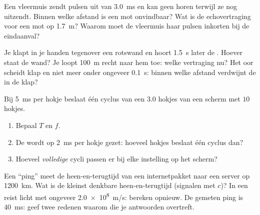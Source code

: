 \begin{exercise}[$\star\star\star$]\label{exo:g10:signals-and-waves:12}
Een vleermuis zendt pulsen  uit van \qty{3.0}{ms} en kan geen
 horen terwijl ze nog uitzendt. Binnen welke afstand is een mot
onvindbaar? Wat is de echovertraging voor een mot op \qty{1.7}{m}?
Waarom moet de vleermuis haar pulsen inkorten bij de eindaanval?
\end{exercise}

\begin{exercise}[$\star\star\star$]\label{exo:g10:signals-and-waves:13}
Je klapt in je handen tegenover een rotswand en hoort \qty{1.5}{s} later
de . Hoever staat de wand? Je loopt \qty{100}{m} recht naar hem toe:
welke vertraging nu? Het oor scheidt klap en  niet meer onder
ongeveer \qty{0.1}{s}: binnen welke afstand verdwijnt de  in de klap?
\end{exercise}

\begin{exercise}[$\star\star\star$]\label{exo:g10:signals-and-waves:14}
Bij \qty{5}{ms} per hokje beslaat één cyclus van een  $3.0$
hokjes van een scherm met $10$ hokjes.
\begin{enumerate}
  \item Bepaal $T$ en $f$.
  \item De  wordt op \qty{2}{ms} per hokje gezet: hoeveel hokjes
        beslaat één cyclus dan?
  \item Hoeveel \emph{volledige} cycli passen er bij elke instelling op
        het scherm?
\end{enumerate}
\end{exercise}

\begin{exercise}[$\star\star\star$]\label{exo:g10:signals-and-waves:15}
Een ``ping'' meet de heen-en-terugtijd van een internetpakket naar een
server op \qty{1200}{km}. Wat is de kleinst denkbare heen-en-terugtijd
(signalen met $c$)? In een  reist licht met ongeveer
\qty{2.0e8}{m/s}: bereken opnieuw. De gemeten ping is \qty{40}{ms}: geef
twee redenen waarom die je antwoorden overtreft.
\end{exercise}

